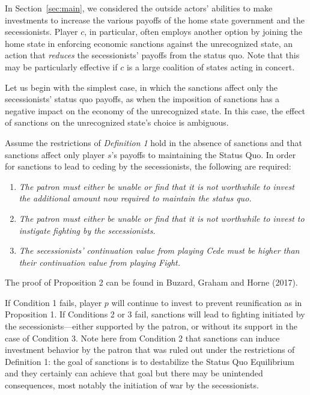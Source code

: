 In Section~\ref{sec:main}, we considered the outside actors' abilities to make investments to increase the various payoffs of the home state government and the secessionists. Player $c$, in particular, often employs another option by joining the home state in enforcing economic sanctions against the unrecognized state, an action that \emph{reduces} the secessionists' payoffs from the status quo. Note that this may be particularly effective if $c$ is a large coalition of states acting in concert. 

Let us begin with the simplest case, in which the sanctions affect only the secessionists' status quo payoffs, as when the imposition of sanctions has a negative impact on the economy of the unrecognized state. In this case, the effect of sanctions on the unrecognized state's choice is ambiguous. 

\begin{proposition}
Assume the restrictions of \emph{Definition 1} hold in the absence of sanctions and that sanctions affect only player $s$'s payoffs to maintaining the Status Quo.  In order for sanctions to lead to ceding by the secessionists, the following are required:

\begin{enumerate}
\item \textit{The patron must either be unable or find that it is not worthwhile to invest the additional amount now required to maintain the status quo.}

\item \textit{The patron must either be unable or find that it is not worthwhile to invest to instigate fighting by the secessionists.}

\item \textit{The secessionists' continuation value from playing Cede must be higher than their continuation value from playing Fight.}
\end{enumerate}

\end{proposition}

The proof of Proposition 2 can be found in Buzard, Graham and Horne (2017).

If Condition 1 fails, player $p$ will continue to invest to prevent reunification as in Proposition 1. If Conditions 2 or 3 fail, sanctions will lead to fighting initiated by the secessionists---either supported by the patron, or without its support in the case of Condition 3. Note here from Condition 2 that sanctions can induce investment behavior by the patron that was ruled out under the restrictions of Definition 1: the goal of sanctions is to destabilize the Status Quo Equilibrium and they certainly can achieve that goal but there may be unintended consequences, most notably the initiation of war by the secessionists. 

